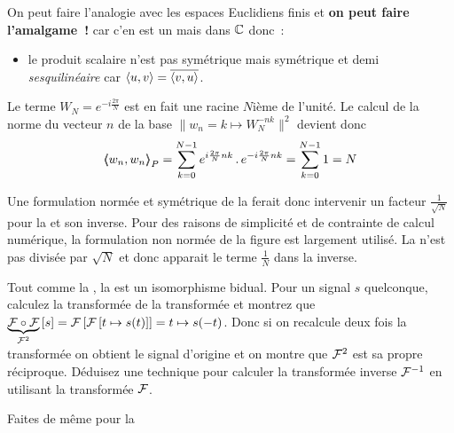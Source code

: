 


On peut faire l'analogie avec les espaces Euclidiens finis et \textbf{on peut faire l'amalgame~!} car c'en est un mais dans $\mathbb{C}$ donc~:
\begin{itemize}
\item le produit scalaire n'est pas symétrique mais \og{}symétrique et demi\fg{} \cad \emph{sesquilinéaire} car $\langle u,v\rangle=\overline{\langle v,u\rangle}$.
\end{itemize}

\begin{remarque}
  Le terme $W_N= e^{-i \frac{2 \pi}{N}}$ est en fait une racine $N$ième de l'unité. Le calcul de la norme du vecteur $n$ de la base $\|w_n=k\mapsto W_N^{-nk}\|^2$ devient donc $$\langle\!\!\langle w_n,w_n{\rangle\!\!\rangle}_P=\sum\limits_{k=0}^{N-1}{e^{i \frac{2 \pi}{N}nk}\,.\,e^{-i \frac{2 \pi}{N}nk}} =\sum\limits_{k=0}^{N-1}{1}=N $$

  Une formulation normée et symétrique de la \TFD{} ferait donc intervenir un facteur $\frac{1}{\sqrt{N}}$ pour la \TFD{} et son inverse. Pour des raisons de simplicité et de contrainte de calcul numérique, la formulation non normée de la figure est largement utilisé. La \TFD{} n'est pas divisée par $\sqrt{N}$ et donc apparait le terme $\frac{1}{N}$ dans la \TFD{} inverse.
\end{remarque}

\begin{exercice}
  Tout comme la \TF{}, la \TFD{} est un isomorphisme bidual. Pour un
  signal $s$ quelconque, calculez la transformée de la transformée et
  montrez que
  $ \underbrace{\mathcal{F}\circ \mathcal{F}}_{\mathcal{F}^2}\left[s\right]=\mathcal{F}\left[\mathcal{F}\left[t\mapsto s(t)\right]\right] =
  t\mapsto s(-t)$. Donc si on recalcule deux fois la transformée on obtient le signal d'origine et on montre que $\mathcal{F}^2$ est sa propre réciproque. Déduisez une technique pour calculer la transformée inverse $\mathcal{F}^{-1}$ en utilisant la transformée $\mathcal{F}$.

  Faites de même pour la \TFD{} 
\end{exercice}




